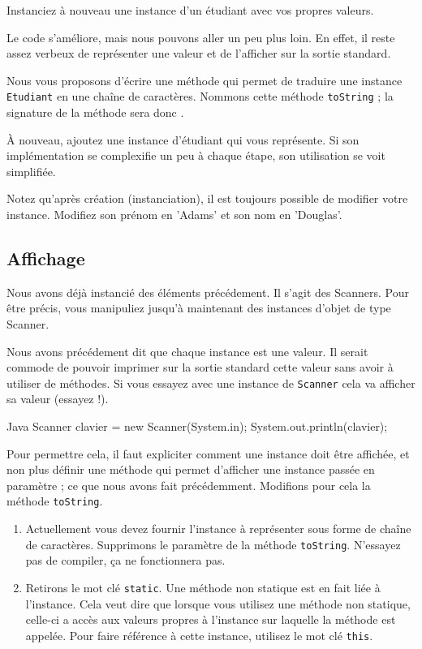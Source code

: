 \documentclass[a4paper,11pt]{article}
\begin{document}

	Instanciez à nouveau une instance d'un étudiant avec vos propres valeurs.

	\bigskip

	Le code s'améliore, mais nous pouvons aller un peu plus loin. En effet, il reste assez verbeux de représenter une valeur et de l'afficher sur la sortie standard.

	Nous vous proposons d'écrire une méthode qui permet de \og traduire\fg{} une instance \texttt{Etudiant} en une chaîne de caractères. Nommons cette méthode \texttt{toString} ; la signature de la méthode sera donc .


	À nouveau, ajoutez une instance d'étudiant qui vous représente. Si son implémentation se complexifie un peu à chaque étape, son utilisation se voit simplifiée.

	Notez qu'après création (instanciation), il est toujours possible de modifier votre instance. Modifiez son prénom en 'Adams' et son nom en 'Douglas'.


	\subsection{Affichage}

	Nous avons déjà instancié des éléments précédement. Il s'agit des Scanners. Pour être précis, vous manipuliez jusqu'à maintenant des instances d'objet de type Scanner.

	Nous avons précédement dit que chaque instance est une valeur. Il serait commode de pouvoir imprimer sur la sortie standard cette valeur sans avoir à utiliser de méthodes. Si vous essayez avec une instance de \texttt{Scanner} cela va afficher sa valeur (essayez !).
	\begin{Code}{Java}
		Scanner clavier = new Scanner(System.in);
		System.out.println(clavier);
	\end{Code}

	Pour permettre cela, il faut expliciter comment une instance doit être affichée, et non plus définir une méthode qui permet d'afficher une instance passée en paramètre ; ce que nous avons fait précédemment. Modifions pour cela la méthode \texttt{toString}. 
	\begin{enumerate}
		\item Actuellement vous devez fournir l'instance à représenter sous forme de chaîne de caractères. Supprimons le paramètre de la méthode \texttt{toString}. N'essayez pas de compiler, ça ne fonctionnera pas.
		\item Retirons le mot clé \texttt{static}. Une méthode non statique est en fait liée à l'instance. Cela veut dire que lorsque vous utilisez une méthode non statique, celle-ci a accès aux valeurs propres à l'instance sur laquelle la méthode est appelée. Pour faire référence à cette instance, utilisez le mot clé \texttt{this}.
	\end{enumerate} 
\end{document}
